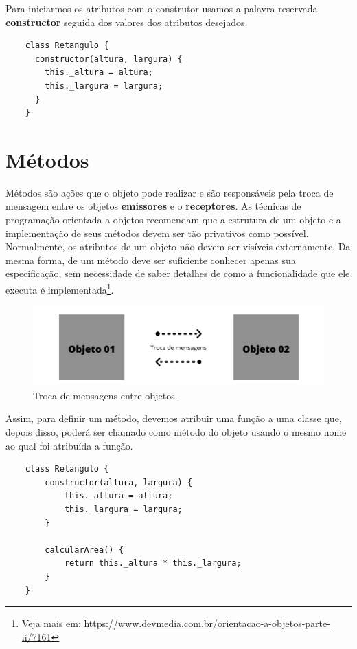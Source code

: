 Para iniciarmos os atributos com o construtor usamos a palavra reservada \textbf{constructor} seguida dos valores dos atributos desejados.

\begin{verbatim}
	class Retangulo {
	  constructor(altura, largura) {
	  	this._altura = altura;
	  	this._largura = largura;
	  }
	}
\end{verbatim}

\section{Métodos}

Métodos são ações que o objeto pode realizar e são responsáveis pela troca de mensagem entre os objetos \textbf{emissores} e o \textbf{receptores}. As técnicas de programação orientada a objetos recomendam que a estrutura de um objeto e a implementação de seus métodos devem ser tão privativos como possível. Normalmente, os atributos de um objeto não devem ser visíveis externamente. Da mesma forma, de um método deve ser suficiente conhecer apenas sua especificação, sem necessidade de saber detalhes de como a funcionalidade que ele executa é implementada\footnote{Veja mais em: \url{https://www.devmedia.com.br/orientacao-a-objetos-parte-ii/7161}}.

\begin{figure}[H]
	\centering
	\includegraphics[scale=0.5]{imagens/troca-mensagens.png}
	\caption{Troca de mensagens entre objetos.}
	\label{fig:troca-mensagem}
\end{figure}

Assim, para definir um método, devemos atribuir uma função a uma classe que, depois disso, poderá ser chamado como método do objeto usando o mesmo nome ao qual foi atribuída a função. 

\begin{verbatim}
	class Retangulo {
		constructor(altura, largura) {
			this._altura = altura;
			this._largura = largura;
		}
	
		calcularArea() {
			return this._altura * this._largura;
		}
	}
\end{verbatim}

